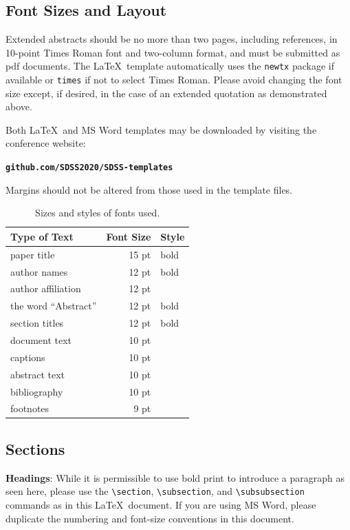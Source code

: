 \documentclass[10pt]{article}
\begin{document}
\subsection{Font Sizes and Layout}
Extended abstracts should be no more than two pages, including references,
in 10-point Times Roman font and two-column format, and must be submitted as pdf documents.
The \LaTeX\ template automatically uses the {\tt newtx} package if available
or {\tt times} if not to select Times Roman.
Please avoid changing the font size except, if desired, in the case of an extended
quotation as demonstrated above.

Both \LaTeX\ and 
MS Word templates may be downloaded by visiting the conference website:
\begin{center}
\textbf{\texttt{github.com/SDSS2020/SDSS-templates}}
\end{center}
Margins should not be altered from those used in the template files.

\begin{table}[h]
\begin{center}
\begin{tabular}{|l|rl|}
\hline \bf Type of Text & \bf Font Size & \bf Style \\ \hline
paper title & 15 pt & bold \\
author names & 12 pt & bold \\
author affiliation & 12 pt & \\
the word ``Abstract'' & 12 pt & bold \\
section titles & 12 pt & bold \\
document text & 10 pt  &\\
captions & 10 pt & \\
abstract text & 10 pt & \\
bibliography & 10 pt & \\
footnotes & 9 pt & \\
\hline
\end{tabular}
\end{center}
\caption{\label{fontsizes} Sizes and styles of fonts used.}
\end{table}


\subsection{Sections}
\label{info-on-sections}

{\bf Headings}: While it is permissible to use bold print to introduce a paragraph
as seen here, please use the \verb+\section+,
\verb+\subsection+, and \verb+\subsubsection+
commands as in this \LaTeX\ document.  If you are using MS Word, please duplicate
the numbering and font-size conventions in this document.
\end{document}
